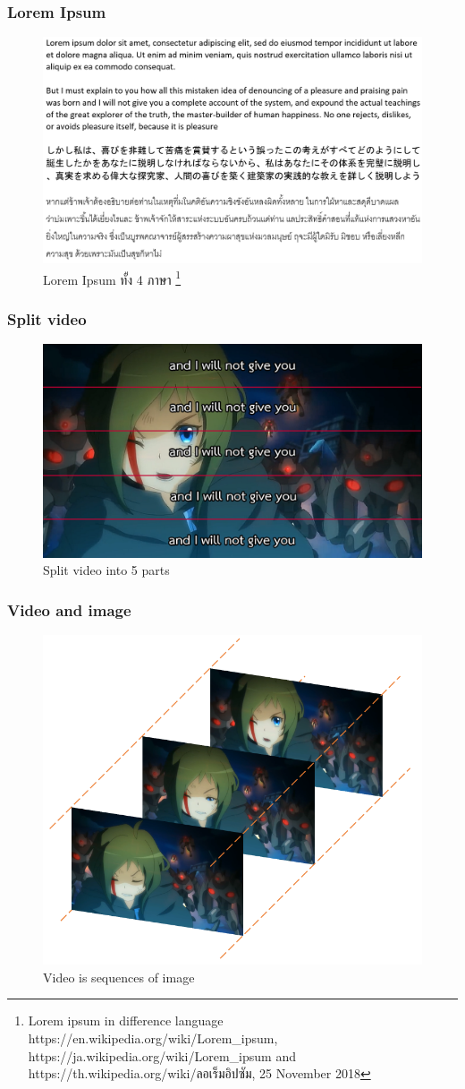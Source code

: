 \documentclass[xcolor=dvipsnames, xetex,serif]{beamer}
\begin{document}
    \begin{frame}
        \frametitle{Lorem Ipsum}
            \begin{figure}[H]
            \centering
            \includegraphics[width=0.85\linewidth]{images/lorem4lang.png}
            \caption{Lorem Ipsum ทั้ง 4 ภาษา \footnote{ \tiny{Lorem ipsum in difference language https://en.wikipedia.org/wiki/Lorem\_ipsum,  https://ja.wikipedia.org/wiki/Lorem\_ipsum and  https://th.wikipedia.org/wiki/ลอเร็มอิปซัม, 25 November 2018} } }
        \end{figure}
    \end{frame}
    \begin{frame}
        \frametitle{Split video}
            \begin{figure}[H]
            \centering
            \includegraphics[width=0.8\linewidth]{images/inori-subbed-preview.png}
            \caption{Split video into 5 parts}
        \end{figure}
    \end{frame}
    \begin{frame}
    \frametitle{Video and image}
        \begin{figure}[H]
            \centering
            \includegraphics[width=0.6\linewidth]{images/anime-frame.png}
            \caption{Video is sequences of image}
        \end{figure}
    \end{frame}
\end{document}
